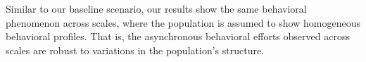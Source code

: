 \documentclass[9pt,twocolumn,twoside]{pnas-new}
\begin{document}
Similar to our baseline scenario, our results show the same behavioral phenomenon across scales, where the population is assumed to show homogeneous behavioral profiles.
That is, the asynchronous behavioral efforts observed across scales are robust to variations in the population's structure.
\end{document}
